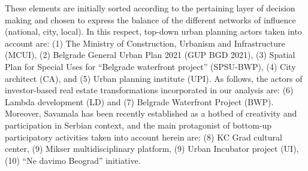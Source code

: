 \documentclass[11pt]{report}
\begin{document}
These elements are initially sorted according to the pertaining layer of decision making and chosen to express the balance of the different networks of influence (national, city, local). In this respect, top-down urban planning actors taken into account are:  (1) The Ministry of Construction, Urbanism and Infrastructure (MCUI), (2) Belgrade General Urban Plan 2021 (GUP BGD 2021), (3) Spatial Plan for Special Uses for “Belgrade waterfront project” (SPSU-BWP), (4) City architect (CA), and (5) Urban planning institute (UPI). As follows, the actors of investor-based real estate transformations incorporated in our analysis are:  (6) Lambda development (LD) and (7) Belgrade Waterfront Project (BWP). Moreover, Savamala has been recently established as a hotbed of creativity and participation in Serbian context, and the main protagonist of bottom-up participatory activities taken into account herein are: (8) KC Grad cultural center, (9) Mikser multidisciplinary platform, (9) Urban Incubator project (UI), (10) “Ne davimo Beograd” initiative.
\end{document}

